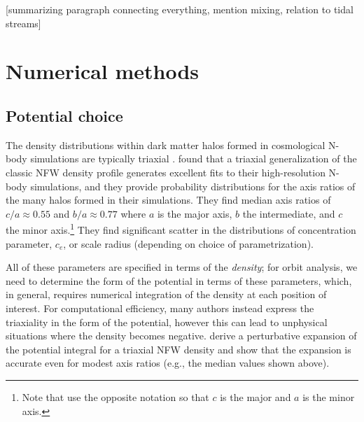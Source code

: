 \documentclass[letterpaper,12pt,preprint]{aastex}
\begin{document}
[summarizing paragraph connecting everything, mention mixing, relation to tidal streams]

\section{Numerical methods}

\subsection{Potential choice}

The density distributions within dark matter halos formed in cosmological N-body simulations are typically triaxial \citep[e.g.,][]{jing02, bett07, zemp09, veraciro11}. \citet{jing02} found that a triaxial generalization of the classic NFW density profile \citep{navarro96} generates excellent fits to their high-resolution N-body simulations, and they provide probability distributions for the axis ratios of the many halos formed in their simulations. They find median axis ratios of $c/a \approx 0.55$ and $b/a \approx 0.77$ where $a$ is the major axis, $b$ the intermediate, and $c$ the minor axis.\footnote{Note that \citet{jing02} use the opposite notation so that $c$ is the major and $a$ is the minor axis.} They find significant scatter in the distributions of concentration parameter, $c_e$, or scale radius (depending on choice of parametrization). 

All of these parameters are specified in terms of the \emph{density}; for orbit analysis, we need to determine the form of the potential in terms of these parameters, which, in general, requires numerical integration of the density at each position of interest. For computational efficiency, many authors instead express the triaxiality in the form of the potential, however this can lead to unphysical situations where the density becomes negative. \citet{leesuto03} derive a perturbative expansion of the potential integral for a triaxial NFW density and show that the expansion is accurate even for modest axis ratios (e.g., the median values shown above). 
\end{document}
